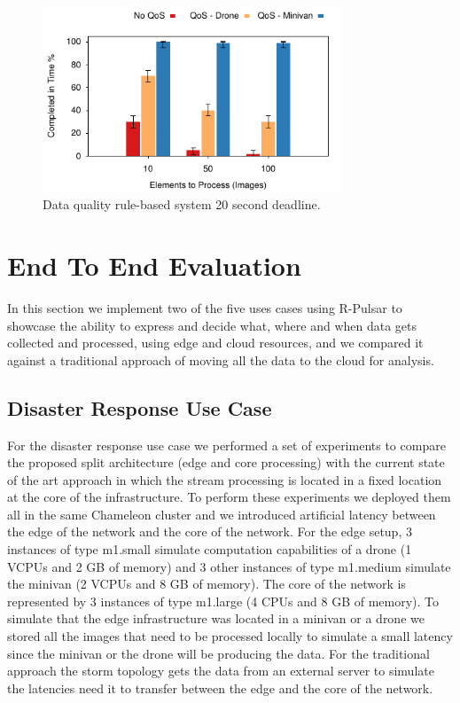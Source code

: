 \begin{figure}[h!]
  \centering
  \includegraphics[width=0.8\textwidth]{Results/QoS}
  \caption{Data quality rule-based system 20 second deadline.}
  \label{fig:QoS}
\end{figure}

\section{End To End Evaluation}
In this section we implement two of the five uses cases using R-Pulsar to showcase the ability to express and decide what, where and when data gets collected and processed, using edge and cloud resources, and we compared it against a traditional approach of moving all the data to the cloud for analysis.

\subsection{Disaster Response Use Case}

For the disaster response use case we performed a set of experiments to compare the proposed split architecture (edge and core processing) with the current state of the art approach in which the stream processing is located in a fixed location at the core of the infrastructure. To perform these experiments we deployed them all in the same Chameleon cluster and we introduced artificial latency between the edge of the network and the core of the network. For the edge setup, 3 instances of type m1.small simulate computation capabilities of a drone (1 VCPUs and 2 GB of memory) and 3 other instances of type m1.medium simulate the minivan (2 VCPUs and 8 GB of memory). The core of the network is represented by 3 instances of type m1.large (4 CPUs and 8 GB of memory). To simulate that the edge infrastructure was located in a minivan or a drone we stored all the images that need to be processed locally to simulate a small latency since the minivan or the drone will be producing the data. For the traditional approach the storm topology gets the data from an external server to simulate the latencies need it to transfer between the edge and the core of the network.

